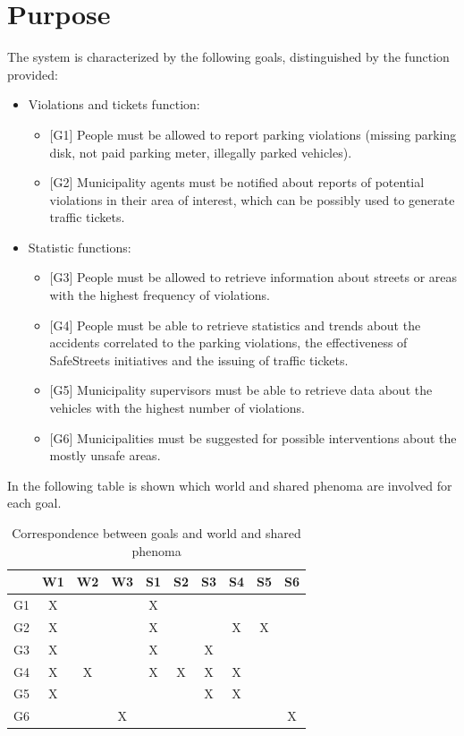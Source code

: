 \documentclass[a4paper]{report}
\begin{document}
\section{Purpose}
The system is characterized by the following goals, distinguished by the function provided:
\begin{itemize}
\item {Violations and tickets function:}

\begin{itemize}
\item{[G1]} \label{G1}People must be allowed to report parking violations (missing parking disk, not paid parking meter, illegally parked vehicles).
\item {[G2]} \label{G2}Municipality agents must be notified about reports of potential violations in their area of interest, which can be possibly used to generate traffic tickets.	
\end{itemize}

\item {Statistic functions:}
\begin{itemize}
\item  {[G3]} \label{G3}People must be allowed to retrieve information about streets or areas with the highest frequency of violations.
\item  {[G4]} \label{G4}People must be able to retrieve statistics and trends about the accidents correlated to the parking violations, the effectiveness of SafeStreets initiatives and the issuing of traffic tickets.
\item  {[G5]} \label{G5}Municipality supervisors must be able to retrieve data about the vehicles with the highest number of violations.
\item  {[G6]} \label{G6}Municipalities must be suggested for possible interventions about the mostly unsafe areas.
\end{itemize}
\end{itemize}

In the following table is shown which world and shared phenoma are involved for each goal.
\begin{table}[H]  
  \centering
  \begin{tabular}{|c|c|c|c|c|c|c|c|c|c|}
    \cline{2-10}
    \multicolumn{1}{c|}{} & W1 & W2 & W3 & S1 & S2 & S3 & S4 & S5 & S6 \\ \hline
    G1 & X &   &   & X &   &   &   &   &   \\ \hline
    G2 & X &   &   & X &   &   & X & X &   \\ \hline
    G3 & X &   &   & X &   & X &   &   &   \\ \hline
    G4 & X & X &   & X & X & X & X &   &   \\ \hline
    G5 & X &   &   &   &   & X & X &   &   \\ \hline
    G6 &   &   & X &   &   &   &   &   & X \\ \hline
  \end{tabular}
  \caption{Correspondence between goals and world and shared phenoma}
\end{table}
\end{document}
